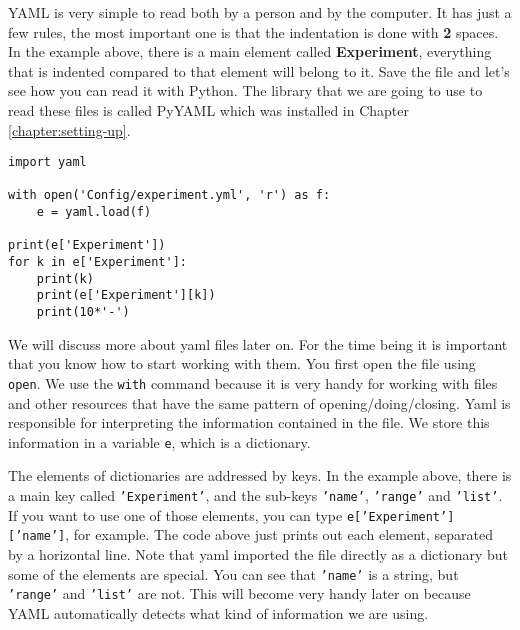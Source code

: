 {YAML} is very simple to read both by a person and by the computer. It has just a few rules, the most important one is that the indentation is done with \textbf{2} spaces. In the example above, there is a main element called \textbf{Experiment}, everything that is indented compared to that element will belong to it. Save the file and let's see how you can read it with Python. The library that we are going to use to read these files is called PyYAML which was installed in Chapter \ref{chapter:setting-up}. 

\begin{verbatim}
import yaml

with open('Config/experiment.yml', 'r') as f:
    e = yaml.load(f)

print(e['Experiment'])
for k in e['Experiment']:
    print(k)
    print(e['Experiment'][k])
    print(10*'-')
\end{verbatim}

We will discuss more about yaml files later on. For the time being it is important that you know how to start working with them. You first open the file using \texttt{open}. We use the \texttt{with} command because it is very handy for working with files and other resources that have the same pattern of opening/doing/closing. Yaml is responsible for interpreting the information contained in the file. We store this information in a variable \texttt{e}, which is a dictionary. 

The elements of dictionaries are addressed by keys. In the example above, there is a main key called \texttt{'Experiment'}, and the
sub-keys \texttt{'name'}, \texttt{'range'} and \texttt{'list'}. If you want to use
one of those elements, you can type \texttt{e['Experiment']['name']}, for example. The code above just prints out each element,
separated by a horizontal line. Note that yaml imported the file directly as a dictionary but some of the elements are special. You can see that \texttt{'name'} is a string, but \texttt{'range'} and \texttt{'list'} are not. This will become very handy later on because YAML automatically detects what kind of information we are using. 



